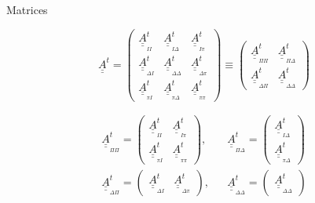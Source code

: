 \documentclass[handout]{beamer}
\newcommand{\Matriz}[1]{\underline{\underline{#1}}}
\newcommand{\SubScript}[1]{_{_{#1}}}
\begin{document}
\begin{frame}{Matrices}

\[
\Matriz{A}^t =
\left(
\begin{array}{ccc}
\Matriz{A}^{t}\SubScript{I I} & \Matriz{A}^{t}\SubScript{I\Delta} & \Matriz{A}^{t}\SubScript{I\pi} \\
\Matriz{A}^{t}\SubScript{\Delta I} & \Matriz{A}^{t}\SubScript{\Delta\Delta} & \Matriz{A}^{t}\SubScript{\Delta\pi} \\
\Matriz{A}^{t}\SubScript{\pi I} & \Matriz{A}^{t}\SubScript{\pi\Delta} & \Matriz{A}^{t}\SubScript{\pi\pi} 
\end{array}
\right) \equiv
\left( \begin{array}{cc}
\Matriz{A}^{t}\SubScript{\Pi \Pi} & \Matriz{A}^{t}\SubScript{\Pi \Delta} \\
\Matriz{A}^{t}\SubScript{\Delta \Pi} & \Matriz{A}^{t}\SubScript{\Delta\Delta} 
\end{array} \right) 
\]

\[
\begin{array}{ccc}
\Matriz{A}^{t}\SubScript{\Pi \Pi} =
\left( \begin{array}{cc}
\Matriz{A}^{t}\SubScript{I I} & \Matriz{A}^{t}\SubScript{I\pi} \\
\Matriz{A}^{t}\SubScript{\pi I} & \Matriz{A}^{t}\SubScript{\pi\pi} 
\end{array} \right), & &
\Matriz{A}^{t}\SubScript{\Pi \Delta} =
\left( \begin{array}{c}
\Matriz{A}^{t}\SubScript{I\Delta} \\
\Matriz{A}^{t}\SubScript{\pi\Delta} 
\end{array} \right)  \\
\Matriz{A}^{t}\SubScript{\Delta \Pi} =
\left( \begin{array}{cc}
\Matriz{A}^{t}\SubScript{\Delta I} & \Matriz{A}^{t}\SubScript{\Delta\pi} 
\end{array} \right), & &
\Matriz{A}^{t}\SubScript{\Delta\Delta} =
\left( \begin{array}{c}
\Matriz{A}^{t}\SubScript{\Delta \Delta} 
\end{array} \right)
\end{array}
\]

\end{frame}
\end{document}
